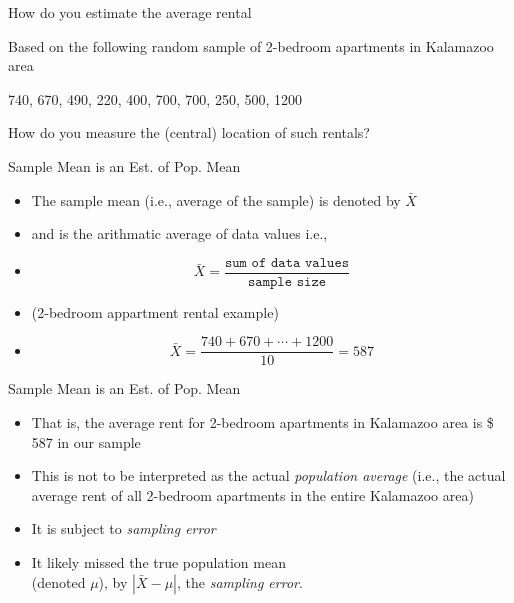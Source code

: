 \documentclass[14pt]{beamer}\usepackage[]{graphicx}\usepackage[]{color}
\begin{document}
\begin{frame}[fragile]{How do you estimate the average rental}

Based on the following random sample of 2-bedroom apartments in Kalamazoo area

\vspace{3mm}



  740, 670, 490, 220, 400, 700, 700, 250, 500, 1200
  
\vspace{3mm}

  How do you measure the (central) location of such rentals?

\end{frame}

\begin{frame}[fragile]{Sample Mean is an Est. of Pop. Mean}

\begin{itemize}
\item<1-> The sample mean (i.e., average of the sample) is denoted by $\bar{X}$
\item<2-> and is the arithmatic average of data values  i.e.,
\item<3->
\begin{equation*}
\bar{X} = \frac{\texttt{sum of data values}}{\texttt{sample size}}
\end{equation*}
\item<4-> (2-bedroom appartment rental example)
\item<5->
\begin{equation*}
\bar{X} = \frac{740 + 670 + \cdots + 1200}{10} = 587
\end{equation*}
\end{itemize}

\end{frame}
 
\begin{frame}[fragile]{Sample Mean is an Est. of Pop. Mean}

\begin{itemize}
\item<1-> That is, the average rent for 2-bedroom apartments in  Kalamazoo area is \$ 587 in our sample
\item<2-> This is not to be interpreted as the actual \textit{population average}  (i.e., the actual average rent of all 2-bedroom apartments in  the entire Kalamazoo area)
\item<3-> It is subject to \textit{sampling error}
\item<4-> It likely missed the true population mean \\ (denoted $\mu$), by $| \bar{X} - \mu |$,  the \textit{sampling error}.
\end{itemize}

\end{frame}
\end{document}
